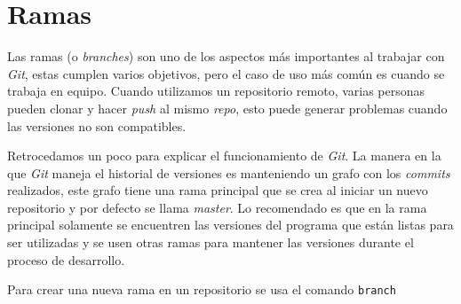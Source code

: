 \section{Ramas}
  Las ramas (o \textit{branches}) son uno de los aspectos más importantes al trabajar con 
  \textit{Git}, estas cumplen varios objetivos, pero el caso de uso más común es cuando se trabaja
  en equipo.
  Cuando utilizamos un repositorio remoto, varias personas pueden clonar y hacer \textit{push} al 
  mismo \textit{repo}, esto puede generar problemas cuando las versiones no son compatibles.

  Retrocedamos un poco para explicar el funcionamiento de \textit{Git}.
  La manera en la que \textit{Git} maneja el historial de versiones es manteniendo un grafo con los
  \textit{commits} realizados, este grafo tiene una rama principal que se crea al iniciar un nuevo
  repositorio y por defecto se llama \textit{master}.
  Lo recomendado es que en la rama principal solamente se encuentren las versiones del programa que
  están listas para ser utilizadas y se usen otras ramas para mantener las versiones durante el 
  proceso de desarrollo.

  Para crear una nueva rama en un repositorio se usa el comando \texttt{branch}
